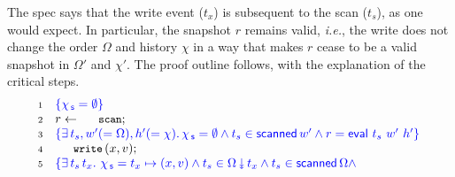 \documentclass[a4paper,UKenglish]{lipics-v2016}
\newcommand{\asgn}{\leftarrow}
\newcommand{\ie}{\emph{i.e.}\xspace}
\newcommand{\dom}[1]{\mathsf{dom}(#1)}
\newcommand{\specK}[1]{\ensuremath{\textcolor{blue}{#1}}}
\newcommand{\esc}[1]{\text{\texttt{\small{#1}}}}
\newcommand{\selfsub}{\mathsf{s}}
\newcommand{\hist}{\chi}
\newcommand{\histS}{\hist_{\, \selfsub}}
\newcommand{\hempty}{\emptyset}
\newcommand{\hpts}{\mapsto}
\newcommand{\ldot}{\mathord{.}\,}
\newcommand{\stableorder}{\Omega}
\newcommand{\stableorderP}{\stableorder'}
\newcommand{\histP}{\chi'}
\newcommand{\num}[1]{{\text{{\scriptsize{#1}}}}}
\def\tbnd{\asgn}
\theoremstyle{definition}
\begin{document}
The spec says that the write event ($t_x$) is subsequent to the scan
($t_s$), as one would expect. In particular, the snapshot $r$ remains
valid, \ie, the write does not change the order $\stableorder$ and
history $\hist$ in a way that makes $r$ cease to be a valid snapshot
in $\stableorderP$ and $\histP$. The proof outline follows, with the
explanation of the critical steps.
%
\[
\!\begin{array}{r l}
 \num{1} & \specK{\{ \histS = \hempty \}}\\ %
 \num{2} & r \tbnd \esc{scan};\\
 \num{3} & \specK{\{ \exists\, t_s, w'(=\stableorder), h'(=\hist)\ldot 
       \histS = \hempty \wedge 
        t_s \in \scanned{w'}  \wedge r = \eval\ t_s\ w'\ h'\}}\\
 \num{4} & \esc{write}\, (x,v);\\
 \num{5} & \specK{\{ \exists\, t_s\, t_x\ldot\, \histS = t_x \hpts (x,
   v) \wedge t_s \in \sideal{\stableorder}{t_x} \wedge t_s \in
   \scanned{\stableorder} \wedge
}
\end{array}\]
\end{document}
